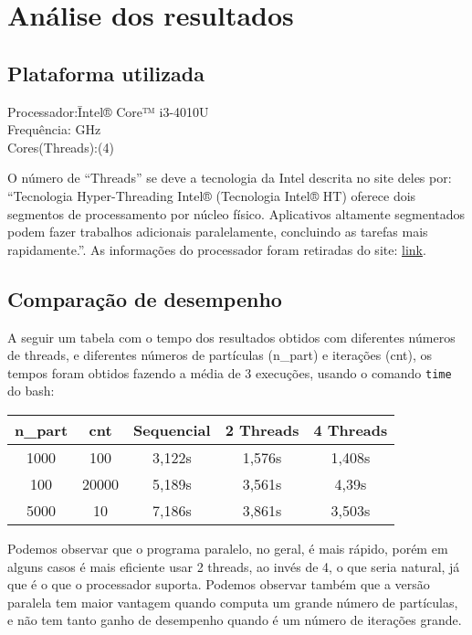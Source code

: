\documentclass[a4paper, 12pt]{article}
\begin{document}

\section{Análise dos resultados}
\subsection{Plataforma utilizada}

\begin{tabbing}
    Processador:\qquad\qquad\=
    Intel® Core™ i3-4010U\\
    Frequência: GHz\\
    Cores(Threads):(4)
\end{tabbing}

O número de ``Threads'' se deve a tecnologia da Intel descrita no site deles
por: ``Tecnologia Hyper-Threading Intel® (Tecnologia Intel® HT) oferece dois
segmentos de processamento por núcleo físico. Aplicativos altamente segmentados
podem fazer trabalhos adicionais paralelamente, concluindo as tarefas mais
rapidamente.''. As informações do processador foram retiradas do site:
\href{http://ark.intel.com/pt-br/products/75107/Intel-Core-i3-4010U-Processor-3M-Cache-1_70-GHz}{link}.


\subsection{Comparação de desempenho}

A seguir um tabela com o tempo dos resultados obtidos com diferentes números de
threads, e diferentes números de partículas (n\_part) e iterações (cnt), os
tempos foram obtidos fazendo a média de 3 execuções, usando o comando
\verb|time| do bash:
\begin{center}
    \begin{tabular}{ |c|c||c|c|c| }
    \hline
    n\_part & cnt & Sequencial & 2 Threads & 4 Threads \\
    \hline
    1000 & 100 & 3,122s & 1,576s & 1,408s \\
    \hline
    100 & 20000 & 5,189s & 3,561s & 4,39s \\
    \hline
    5000 & 10 & 7,186s & 3,861s & 3,503s \\
    \hline
    \end{tabular}
\end{center}
Podemos observar que o programa paralelo, no geral, é mais rápido, porém em
alguns casos é mais eficiente usar 2 threads, ao invés de 4, o que seria
natural, já que é o que o processador suporta. Podemos observar também que a
versão paralela tem maior vantagem quando computa um grande número de
partículas, e não tem tanto ganho de desempenho quando é um número de iterações
grande.
\end{document}
